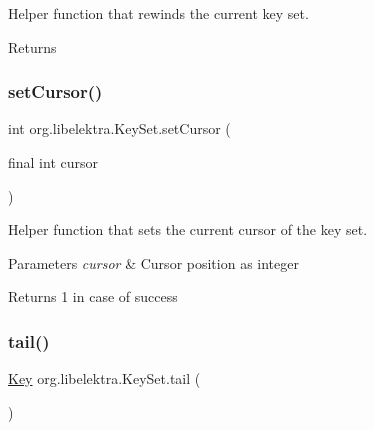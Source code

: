 Helper function that rewinds the current key set. 

\begin{DoxyReturn}{Returns}

\end{DoxyReturn}
\mbox{\label{classorg_1_1libelektra_1_1KeySet_adb3caad35c8dfcd1934d7cd32ff0ca4a}} 
\subsubsection{\texorpdfstring{set\+Cursor()}{setCursor()}}
{\footnotesize\ttfamily int org.\+libelektra.\+Key\+Set.\+set\+Cursor (\begin{DoxyParamCaption}\item[{final int}]{cursor }\end{DoxyParamCaption})\hspace{0.3cm}{\ttfamily [inline]}}



Helper function that sets the current cursor of the key set. 


\begin{DoxyParams}{Parameters}
{\em cursor} & Cursor position as integer \\
\hline
\end{DoxyParams}
\begin{DoxyReturn}{Returns}
1 in case of success 
\end{DoxyReturn}
\mbox{\label{classorg_1_1libelektra_1_1KeySet_ab81aff6c88595b3f4c3307d1f996857f}} 
\subsubsection{\texorpdfstring{tail()}{tail()}}
{\footnotesize\ttfamily \hyperlink{classorg_1_1libelektra_1_1Key}{Key} org.\+libelektra.\+Key\+Set.\+tail (\begin{DoxyParamCaption}{ }\end{DoxyParamCaption})\hspace{0.3cm}{\ttfamily [inline]}}



